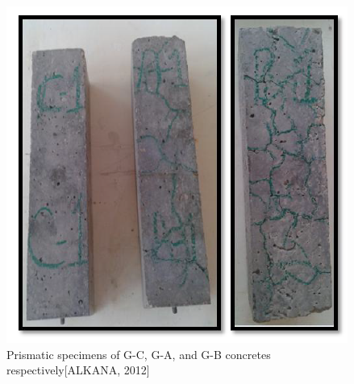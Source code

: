   \begin{figure}[ht!]
    \centering
    \includegraphics[width=.8\linewidth]{Reference/ALKANASRcrack.png}
      \caption{Prismatic specimens of G-C, G-A, and G-B concretes respectively[ALKANA, 2012]}
      \label{ALKANASRcrack}
  \end{figure}


